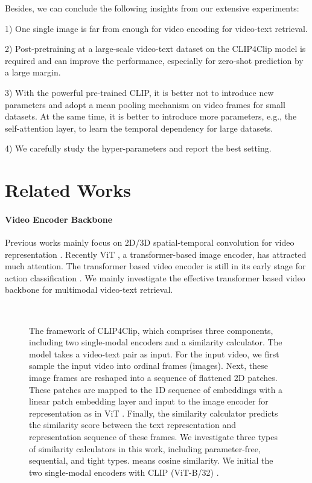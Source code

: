 \documentclass[11pt]{article}
\begin{document}
	Besides, we can conclude the following insights from our extensive experiments:

	1)  One single image is far from enough for video encoding for video-text retrieval.

	2)  Post-pretraining at a large-scale video-text dataset on the CLIP4Clip model is required and can improve the performance, especially for zero-shot prediction by a large margin.

	3)  With the powerful pre-trained CLIP, it is better not to introduce new parameters and adopt a mean pooling mechanism on video frames for small datasets. At the same time, it is better to introduce more parameters, e.g., the self-attention layer, to learn the temporal dependency for large datasets.

	4)  We carefully study the hyper-parameters and report the best setting.

	\section{Related Works}
	\paragraph{Video Encoder Backbone}
	Previous works mainly focus on 2D/3D spatial-temporal convolution for video representation \cite{tran2015learning,Xie2018Rethinking,feichtenhofer2019slowfast}. Recently ViT \cite{dosovitskiy2021an}, a transformer-based image encoder, has attracted much attention. The transformer based video encoder is still in its early stage for action classification \cite{bertasius2021spacetime, arnab2021vivit}. We mainly investigate the effective transformer based video backbone for multimodal video-text retrieval.
	\begin{figure*}[htbp]
		\centering
		 \\
		\caption{The framework of CLIP4Clip, which comprises three components, including two single-modal encoders and a similarity calculator. The model takes a video-text pair as input. For the input video, we first sample the input video into ordinal frames (images). Next, these image frames are reshaped into a sequence of flattened 2D patches. These patches are mapped to the 1D sequence of embeddings with a linear patch embedding layer and input to the image encoder for representation as in ViT \cite{dosovitskiy2021an}. Finally, the similarity calculator predicts the similarity score between the text representation and representation sequence of these frames. We investigate three types of similarity calculators in this work, including parameter-free, sequential, and tight types.  means cosine similarity. We initial the two single-modal encoders with CLIP (ViT-B/32) \cite{radford2021learning}.}
		\label{fig:main_structure}
	\end{figure*}
\end{document}
